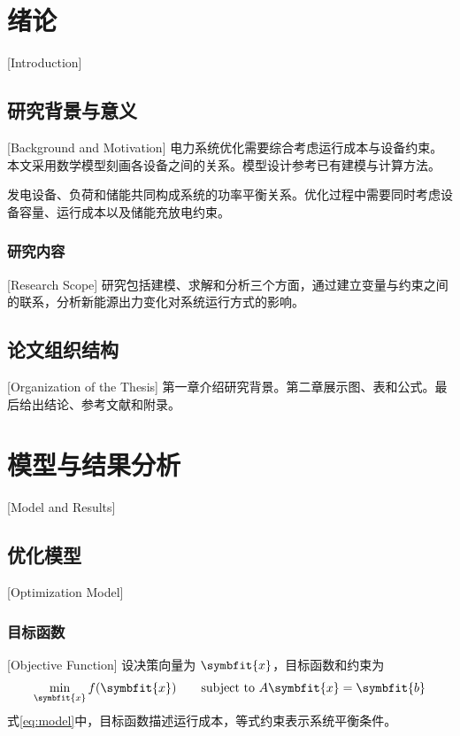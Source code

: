 \chapter{绪论}[Introduction]
\section{研究背景与意义}[Background and Motivation]
电力系统优化需要综合考虑运行成本与设备约束。本文采用数学模型刻画各设备之间的关系。模型设计参考已有建模与计算方法\supercite{knuth,lamport}。

发电设备、负荷和储能共同构成系统的功率平衡关系。优化过程中需要同时考虑设备容量、运行成本以及储能充放电约束。
\subsection{研究内容}[Research Scope]
研究包括建模、求解和分析三个方面，通过建立变量与约束之间的联系，分析新能源出力变化对系统运行方式的影响。
\section{论文组织结构}[Organization of the Thesis]
第一章介绍研究背景。第二章展示图、表和公式。最后给出结论、参考文献和附录。
\chapter{模型与结果分析}[Model and Results]
\section{优化模型}[Optimization Model]
\subsection{目标函数}[Objective Function]
设决策向量为 $\symbfit{x}$，目标函数和约束为
\begin{equation}\label{eq:model}
  \min_{\symbfit{x}} f(\symbfit{x})
  \qquad \text{subject to } A\symbfit{x}=\symbfit{b}
\end{equation}
式\eqref{eq:model}中，目标函数描述运行成本，等式约束表示系统平衡条件。
